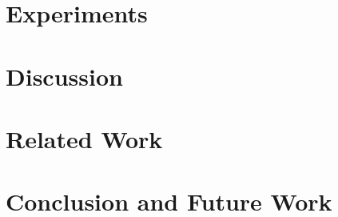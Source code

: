 \documentclass[sigconf]{acmart}
\begin{document}
\section{Experiments}\label{sec.exp}


\section{Discussion}\label{sec.discuss}


\section{Related Work}\label{sec.related}


\section{Conclusion and Future Work}\label{sec.conclusion}




\end{document}
